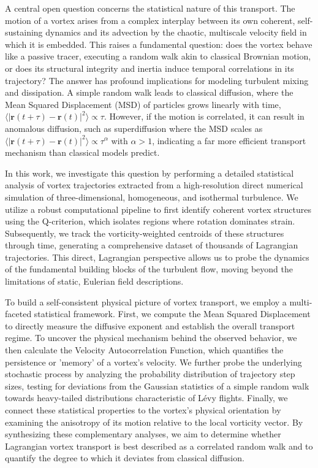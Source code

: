 \documentclass[]{article}
\begin{document}
A central open question concerns the statistical nature of this transport. The motion of a vortex arises from a complex interplay between its own coherent, self-sustaining dynamics and its advection by the chaotic, multiscale velocity field in which it is embedded. This raises a fundamental question: does the vortex behave like a passive tracer, executing a random walk akin to classical Brownian motion, or does its structural integrity and inertia induce temporal correlations in its trajectory? The answer has profound implications for modeling turbulent mixing and dissipation. A simple random walk leads to classical diffusion, where the Mean Squared Displacement (MSD) of particles grows linearly with time, $\langle |\mathbf{r}(t+\tau) - \mathbf{r}(t)|^2 \rangle \propto \tau$. However, if the motion is correlated, it can result in anomalous diffusion, such as superdiffusion where the MSD scales as $\langle |\mathbf{r}(t+\tau) - \mathbf{r}(t)|^2 \rangle \propto \tau^\alpha$ with $\alpha > 1$, indicating a far more efficient transport mechanism than classical models predict.

In this work, we investigate this question by performing a detailed statistical analysis of vortex trajectories extracted from a high-resolution direct numerical simulation of three-dimensional, homogeneous, and isothermal turbulence. We utilize a robust computational pipeline to first identify coherent vortex structures using the Q-criterion, which isolates regions where rotation dominates strain. Subsequently, we track the vorticity-weighted centroids of these structures through time, generating a comprehensive dataset of thousands of Lagrangian trajectories. This direct, Lagrangian perspective allows us to probe the dynamics of the fundamental building blocks of the turbulent flow, moving beyond the limitations of static, Eulerian field descriptions.

To build a self-consistent physical picture of vortex transport, we employ a multi-faceted statistical framework. First, we compute the Mean Squared Displacement to directly measure the diffusive exponent and establish the overall transport regime. To uncover the physical mechanism behind the observed behavior, we then calculate the Velocity Autocorrelation Function, which quantifies the persistence or 'memory' of a vortex's velocity. We further probe the underlying stochastic process by analyzing the probability distribution of trajectory step sizes, testing for deviations from the Gaussian statistics of a simple random walk towards heavy-tailed distributions characteristic of Lévy flights. Finally, we connect these statistical properties to the vortex's physical orientation by examining the anisotropy of its motion relative to the local vorticity vector. By synthesizing these complementary analyses, we aim to determine whether Lagrangian vortex transport is best described as a correlated random walk and to quantify the degree to which it deviates from classical diffusion.
\end{document}
